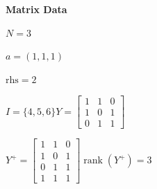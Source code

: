 \documentclass[11pt]{article}
\begin{document}
\noindent\textbf{Matrix Data}
\par $N=3$
\par $a=\left(1,1,1\right)$
\par $\mathrm{rhs}=2$
\par $I=\{4,5,6\}$\quad$Y=\begin{bmatrix}1 & 1 & 0 \\ 1 & 0 & 1 \\ 0 & 1 & 1\end{bmatrix}$
\par $Y^{+}=\begin{bmatrix}1 & 1 & 0 \\ 1 & 0 & 1 \\ 0 & 1 & 1 \\ 1 & 1 & 1\end{bmatrix}$\quad$\operatorname{rank}(Y^{+})=3$
\end{document}
